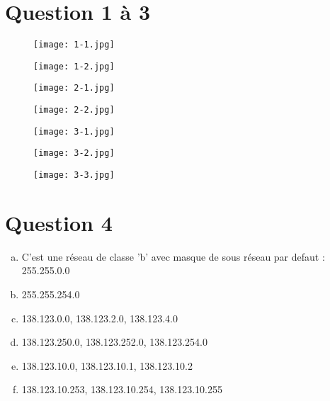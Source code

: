 \section{Question 1 à 3}
\begin{figure}[h]
\texttt{[image: 1-1.jpg]}
\end{figure}
\begin{figure}[h]
\texttt{[image: 1-2.jpg]}
\end{figure}
\begin{figure}[h]
\texttt{[image: 2-1.jpg]}
\end{figure}
\begin{figure}[h]
\texttt{[image: 2-2.jpg]}
\end{figure}
\begin{figure}[h]
\texttt{[image: 3-1.jpg]}
\end{figure}\begin{figure}[h]
\texttt{[image: 3-2.jpg]}
\end{figure}\begin{figure}[h]
\texttt{[image: 3-3.jpg]}
\end{figure}
\clearpage
\section{Question 4}
\begin{enumerate}[(a)]
	\item C'est une réseau de classe 'b' avec masque de sous réseau 
		par defaut : 255.255.0.0
	\item 255.255.254.0
	\item 138.123.0.0, 138.123.2.0, 138.123.4.0
	\item 138.123.250.0, 138.123.252.0, 138.123.254.0
	\item 138.123.10.0, 138.123.10.1, 138.123.10.2
	\item 138.123.10.253, 138.123.10.254, 138.123.10.255
\end{enumerate}

